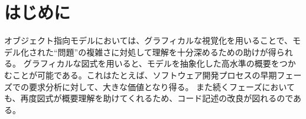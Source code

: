 \documentclass[\pformat,12pt,twoside]{jarticle}
\newcommand{\vdmtools}{\textbf{VDMTools}}
\begin{document}



\nolinenumbering
{}

\newcommand{\tab}{\makebox[4em]{}}


\vfill
\begin{abstract}
オブジェクト指向分析におけるグラフィカルモデルの限界については、広く知られていることである。 視覚化においては優れている一方で、正確かつ明白な記述を行うために十分なものではない。 

本書では、オブジェクト指向形式仕様言語VDM++において、UMLにおけるグラフィカルモデルの利点を形式モデル化や正当性確認への合理的かつ簡易なアプローチに結びつける手法とツールを、\vdmtools\ の機能を借りて明らかにしていく。

\vdmtools\ は VDM++ と UML(Rational Rose) の相互変換を提供している。
これによりUMLのユーザーもまた、不変条件や事前条件および事後条件といった自動的な注釈チェックを用いて、型チェックを行ったり実行可能モデルのテストを行うといった、強化された分析と正当性確認の機能を得ることとなる。

\end{abstract}
\vfill

\newpage

\section{はじめに}

オブジェクト指向モデルにおいては、グラフィカルな視覚化を用いることで、モデル化された``問題''の複雑さに対処して理解を十分深めるための助けが得られる。
グラフィカルな図式を用いると、モデルを抽象化した高水準の概要をつかむことが可能である。これはたとえば、ソフトウェア開発プロセスの早期フェーズでの要求分析に対して、大きな価値となり得る。
また続くフェーズにおいても、再度図式が概要理解を助けてくれるため、コード記述の改良が図れるのである。
\end{document}
